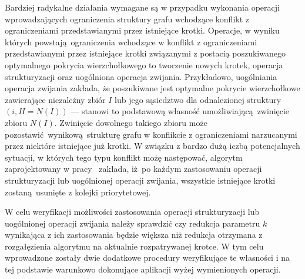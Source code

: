 \par{
  Bardziej radykalne działania wymagane są w przypadku wykonania operacji wprowadzających ograniczenia struktury grafu wchodzące konflikt z ograniczeniami przedstawianymi przez istniejące krotki.
  Operacje, w wyniku których powstają ograniczenia wchodzące w konflikt z ograniczeniami przedstawianymi przez istniejące krotki związanymi z postacią poszukiwanego optymalnego pokrycia wierzchołkowego to tworzenie nowych krotek, operacja strukturyzacji oraz uogólniona operacja zwijania.
  Przykładowo, uogólniania operacja zwijania zakłada, że poszukiwane jest optymalne pokrycie wierzchołkowe zawierające niezależny zbiór $I$ lub jego sąsiedztwo dla odnalezionej struktury $(i, H=N(I))$ --- stanowi to podstawową własność umożliwiającą zwinięcie zbioru $N(I)$.
  Zwinięcie dowolnego takiego zbioru może pozostawić wynikową strukturę grafu w konflikcie z ograniczeniami narzucanymi przez niektóre istniejące już krotki.
  W związku z bardzo dużą iczbą potencjalnych sytuacji, w których tego typu konflikt możę następować, algorytm zaprojektowany w pracy~\cite{ImprovedBounds10} zakłada, iż po każdym zastosowaniu operacji strukturyzacji lub uogólnionej operacji zwijania, wszystkie istniejące krotki zostaną usunięte z kolejki priorytetowej.

  W celu weryfikacji możliwości zastosowania operacji strukturyzacji lub uogólnionej operacji zwijania należy sprawdzić czy redukcja parametru $k$ wynikająca z ich zastosowania będzie większa niż redukcja otrzymana z rozgałęzienia algorytmu na aktualnie rozpatrywanej krotce.
  W tym celu wprowadzone zostały dwie dodatkowe procedury weryfikujące te własności i na tej podstawie warunkowo dokonujące aplikacji wyżej wymienionych operacji.
}

